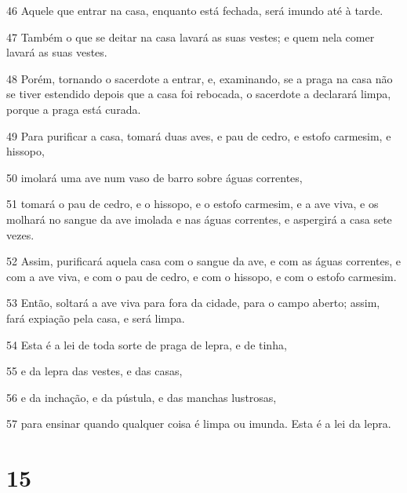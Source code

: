 \par 46 Aquele que entrar na casa, enquanto está fechada, será imundo até à tarde.
\par 47 Também o que se deitar na casa lavará as suas vestes; e quem nela comer lavará as suas vestes.
\par 48 Porém, tornando o sacerdote a entrar, e, examinando, se a praga na casa não se tiver estendido depois que a casa foi rebocada, o sacerdote a declarará limpa, porque a praga está curada.
\par 49 Para purificar a casa, tomará duas aves, e pau de cedro, e estofo carmesim, e hissopo,
\par 50 imolará uma ave num vaso de barro sobre águas correntes,
\par 51 tomará o pau de cedro, e o hissopo, e o estofo carmesim, e a ave viva, e os molhará no sangue da ave imolada e nas águas correntes, e aspergirá a casa sete vezes.
\par 52 Assim, purificará aquela casa com o sangue da ave, e com as águas correntes, e com a ave viva, e com o pau de cedro, e com o hissopo, e com o estofo carmesim.
\par 53 Então, soltará a ave viva para fora da cidade, para o campo aberto; assim, fará expiação pela casa, e será limpa.
\par 54 Esta é a lei de toda sorte de praga de lepra, e de tinha,
\par 55 e da lepra das vestes, e das casas,
\par 56 e da inchação, e da pústula, e das manchas lustrosas,
\par 57 para ensinar quando qualquer coisa é limpa ou imunda. Esta é a lei da lepra.

\chapter{15}

